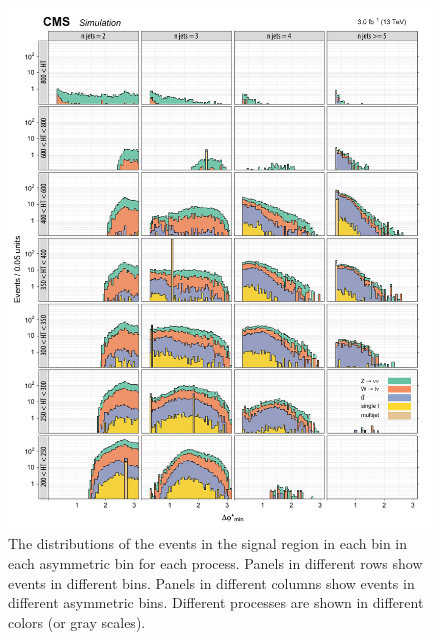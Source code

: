 \begin{figure}[!h]
\centering
\includegraphics[scale=0.95]{figures/kiplots/c150107_s150318_f015_biasedDPhi_40}
\caption{The \bdphi distributions of the events in the signal region
in each \scalht bin in each asymmetric \njet bin for each process.
Panels in different rows show events in different \scalht bins. Panels
in different columns show events in different asymmetric \njet bins.
Different processes are shown in different colors (or gray scales).}
\label{c150107_s150318_f015_biasedDPhi_40}
\end{figure}

